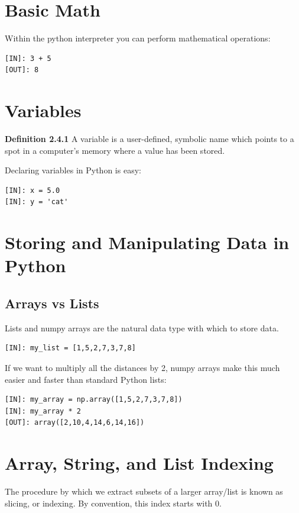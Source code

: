 \section{Basic Math} %
Within the python interpreter you can perform mathematical operations: %

\begin{lstlisting}
[IN]: 3 + 5
[OUT]: 8
\end{lstlisting} %

\section{Variables} %
\textbf{Definition 2.4.1} A variable is a user-defined, symbolic name which points to a spot in a computer's memory where a value has been stored. %

Declaring variables in Python is easy: %

\begin{lstlisting}
[IN]: x = 5.0
[IN]: y = 'cat'
\end{lstlisting} %

\section{Storing and Manipulating Data in Python} %
\subsection{Arrays vs Lists} %
Lists and numpy arrays are the natural data type with which to store data. %

\begin{lstlisting}
[IN]: my_list = [1,5,2,7,3,7,8]
\end{lstlisting} %

If we want to multiply all the distances by 2, numpy arrays make this much easier and faster than standard Python lists: %

\begin{lstlisting}
[IN]: my_array = np.array([1,5,2,7,3,7,8])
[IN]: my_array * 2
[OUT]: array([2,10,4,14,6,14,16])
\end{lstlisting} %

\section{Array, String, and List Indexing} %
The procedure by which we extract subsets of a larger array/list is known as slicing, or indexing. %
By convention, this index starts with 0. %


